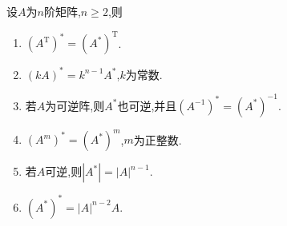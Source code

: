 \documentclass[../../main.tex]{subfiles}%
\begin{document}
\begin{proposition}[伴随矩阵的性质]\label{proposition:伴随矩阵的性质}
设\(A\)为\(n\)阶矩阵,\(n\geqslant  2\),则
\begin{enumerate}
\item\label{伴随矩阵的性质1}  \((A^{\mathrm{T}})^* = (A^*)^{\mathrm{T}}\).

\item  \((kA)^* = k^{n - 1}A^*\),\(k\)为常数.

\item\label{伴随矩阵的性质3}  若$A$为可逆阵,则$A^*$也可逆,并且\((A^{-1})^* = (A^*)^{-1}\).

\item  \((A^{m})^* = (A^*)^{m}\),\(m\)为正整数.

\item\label{伴随矩阵的性质5} 若$A$可逆,则\(|A^*| = |A|^{n - 1}\).

\item  \((A^*)^* = |A|^{n - 2}A\).
\end{enumerate}
\end{proposition}
\end{document}

